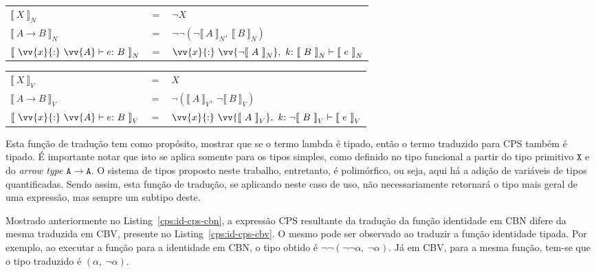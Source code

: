 \phantom{Newline}

\begin{tabular}{lcl}
     ${\llbracket\ X\ \rrbracket}_N$ & $=$ & $\neg X$ \\ 
     ${\llbracket\ A \rightarrow B\ \rrbracket}_N$ & $=$ & $\neg\neg(\neg{\llbracket\ A\ \rrbracket}_N,\ {\llbracket\ B\ \rrbracket}_N)$ \\ 
     ${\llbracket\ \vv{x}{:}\ \vv{A} \vdash e{:}\ B\ \rrbracket}_N$ & $=$ & $\vv{x}{:}\ \vv{\neg{\llbracket\ A\ \rrbracket}_N},\ k{:}\ {\llbracket\ B\ \rrbracket}_N \vdash {\llbracket\ e\ \rrbracket}_N$ \\ 
\end{tabular}

\phantom{Newline}

\begin{tabular}{lcl}
     ${\llbracket\ X\ \rrbracket}_V$ & $=$ & $X$ \\ 
     ${\llbracket\ A \rightarrow B\ \rrbracket}_V$ & $=$ & $\neg({\llbracket\ A\ \rrbracket}_V,\ \neg{\llbracket\ B\ \rrbracket}_V)$ \\ 
     ${\llbracket\ \vv{x}{:}\ \vv{A} \vdash e{:}\ B\ \rrbracket}_V$ & $=$ & $\vv{x}{:}\ \vv{{\llbracket\ A\ \rrbracket}_V},\ k{:}\ \neg{\llbracket\ B\ \rrbracket}_V \vdash {\llbracket\ e\ \rrbracket}_V$ \\ 
\end{tabular}

\phantom{Newline}

\noindent Esta função de tradução tem como propósito, mostrar que se o termo lambda é tipado, então o termo traduzido para CPS também é tipado.
É importante notar que isto se aplica somente para os tipos simples, como definido no tipo funcional a partir do tipo primitivo $\mathtt{X}$ e do \textit{arrow type} $\mathtt{A \to A}$.
O sistema de tipos proposto neste trabalho, entretanto, é polimórfico, ou seja, aqui há a adição de variáveis de tipos quantificadas.
Sendo assim, esta função de tradução, se aplicando neste caso de uso, não necessariamente retornará o tipo mais geral de uma expressão, mas sempre um subtipo deste.

Mostrado anteriormente no Listing~\ref{cps:id-cps-cbn}, a expressão CPS resultante da tradução da função identidade em CBN difere da mesma traduzida em CBV, presente no Listing~\ref{cps:id-cps-cbv}.
O mesmo pode ser observado ao traduzir a função identidade tipada.
Por exemplo, ao executar a função para a identidade em CBN, o tipo obtido é $\neg\neg(\neg\neg\alpha,\ \neg\alpha)$.
Já em CBV, para a mesma função, tem-se que o tipo traduzido é $(\alpha,\ \neg\alpha)$.

